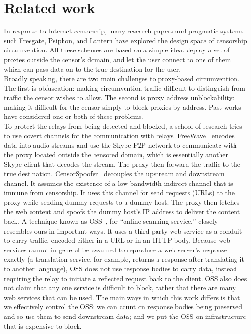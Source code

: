 \documentclass{article}  usepackage{url}
\begin{document}

\section{Related work}

In response to Internet censorship, many research papers and pragmatic systems
such Freegate, Psiphon, and Lantern have explored the design space of censorship
circumvention. All these schemes are based on a simple idea: deploy a set of
proxies outside the censor's domain, and let the user connect to one of them
which can pass data on to the true destination for the user.\\

Broadly speaking, there are two main challenges to proxy-based circumvention.
The first is obfuscation: making circumvention traffic difficult to distinguish
from traffic the censor wishes to allow. The second is proxy address
unblockability: making it difficult for the censor simply to block proxies by
address. Past works have considered one or both of these problems.\\

To protect the relays from being detected and blocked, a school of research
tries to use covert channels for the communication with relays.
FreeWave~\cite{freewave} encodes data into audio streams and use the Skype P2P
network to communicate with the proxy located outside the censored domain, which
is essentially another Skype client that decodes the stream. The proxy then
forward the traffic to the true destination. CensorSpoofer~\cite{censorspoofer}
decouples the upstream and downstream channel. It assumes the existence of a
low-bandwidth indirect channel that is immune from censorship. It uses this
channel for send requests (URLs) to the proxy while sending dummy requests to a
dummy host. The proxy then fetches the web content and spoofs the dummy host's
IP address to deliver the content back. A technique known as OSS~\cite{oss}, for
``online scanning service,'' closely resembles ours in important ways. It uses a
third-party web service as a conduit to carry traffic, encoded either in a URL
or in an HTTP body. Because web services cannot in general be assumed to
reproduce a web server's response exactly (a translation service, for example,
returns a response after translating it to another language), OSS does not use
response bodies to carry data, instead requiring the relay to initiate a
reflected request back to the client. OSS also does not claim that any one
service is difficult to block, rather that there are many web services that can
be used. The main ways in which this work differs is that we effectively control
the OSS: we can count on response bodies being preserved and so use them to send
downstream data; and we put the OSS on infrastructure that is expensive to
block.\\
\end{document}
